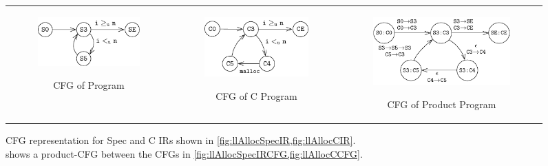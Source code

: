 \begin{figure}[]
\begin{tabular}{ccc}
\begin{subfigure}[b]{0.27\textwidth}
\begin{center}
{\includegraphics[scale=1]{chapters/figures/figMallocSpecCfg.pdf}}
\vspace{2pt}
\end{center}
\caption{\label{fig:llAllocSpecIRCFG}CFG of \SpecL{} Program}
\end{subfigure}%
&
\begin{subfigure}[b]{0.27\textwidth}
\begin{center}
{\includegraphics[scale=0.95]{chapters/figures/figMallocCCfg.pdf}}
\vspace{7pt}
\end{center}
\caption{\label{fig:llAllocCCFG}CFG of C Program}
\end{subfigure}%
&
\begin{subfigure}[b]{0.36\textwidth}
\begin{center}
{\includegraphics[scale=1]{chapters/figures/figMallocProductCfg.pdf}}
\end{center}
\caption{\label{fig:llAllocProductCFG}CFG of Product Program}
\end{subfigure}%
\\
\end{tabular}
\caption{\label{fig:mallocSpecCFGAndCCFG}CFG representation for Spec and C IRs shown in \cref{fig:llAllocSpecIR,fig:llAllocCIR}.\\  shows a product-CFG between the CFGs in \cref{fig:llAllocSpecIRCFG,fig:llAllocCCFG}.}
\end{figure}
